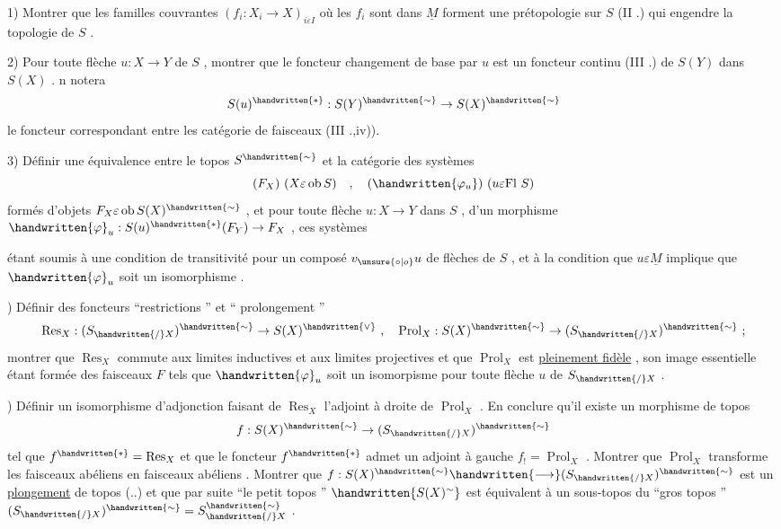1) Montrer que les familles couvrantes \((f_i:X_i\to X)_{i\varepsilon I}\) où les \(f_i\) sont dans \(\underline{M}\) forment une prétopologie sur \(S\) (II .) qui engendre la topologie de \(S\) .

2) Pour toute flèche \(u:X\to Y\) de \(S\) , montrer que le foncteur changement de base par \(u\) est un foncteur continu (III .) de \(S(Y)\) dans \(S(X)\) . n notera
\[
S(u)^{\handwritten{*}}:S(Y)^{\handwritten{\sim}}\to S(X)^{\handwritten{\sim}}
\]
le foncteur correspondant entre les catégorie de faisceaux (III .,iv)).

3) Définir une équivalence entre le topos \(S^{\handwritten{\sim}}\) et la catégorie des systèmes
\[
(F_X)\ (X\varepsilon\operatorname{ob}S)\quad,\quad(\handwritten{\varphi_u})\ (u\varepsilon\mathrm{Fl}\ S)
\]
formés d'objets \(F_X\varepsilon\operatorname{ob}S(X)^{\handwritten{\sim}}\) , et pour toute flèche \(u:X\to Y\) dans \(S\) , d'un morphisme \(\handwritten{\varphi}_u:S(u)^{\handwritten{*}}(F_Y)\to F_X\) , ces systèmes

étant soumis à une condition de transitivité pour un composé \(v_{\unsure{\circ|o}}u\) de flèches de \(S\) , et à la condition que \(u\varepsilon\underline{M}\) implique que \(\handwritten{\varphi}_u\) soit un isomorphisme .

) Définir des foncteurs ``restrictions '' et `` prolongement ''
\[
\operatorname{Res}_X:(S_{\handwritten{/}X})^{\handwritten{\sim}}\to S(X)^{\handwritten{\vee}}\ ,\quad
\operatorname{Prol}_X:S(X)^{\handwritten{\sim}}\to(S_{\handwritten{/}X})^{\handwritten{\sim}}\ ;
\]
montrer que \(\operatorname{Res}_X\) commute aux limites inductives et aux limites projectives et que \(\operatorname{Prol}_X\) est \uline{pleinement fidèle} , son image essentielle étant formée des faisceaux \(F\) tels que \(\handwritten{\varphi}_u\) soit un isomorpisme pour toute flèche \(u\) de  \(S_{\handwritten{/}X}\) .

) Définir un isomorphisme d'adjonction faisant de \(\operatorname{Res}_X\) l'adjoint à droite de \(\operatorname{Prol}_X\) . En conclure qu'il existe un morphisme de topos
\[
f:S(X)^{\handwritten{\sim}}\to(S_{\handwritten{/}X})^{\handwritten{\sim}}
\]
tel que \(f^{\handwritten{*}}=\operatorname{Res}_X\) et que le foncteur \(f^{\handwritten{*}}\) admet un adjoint à gauche \(f_!=\operatorname{Prol}_X\) . Montrer que \(\operatorname{Prol}_X\) transforme les faisceaux abéliens en faisceaux abéliens . Montrer que \(f:S(X)^{\handwritten{\sim}}\handwritten{\longrightarrow}(S_{\handwritten{/}X})^{\handwritten{\sim}}\) est un \uline{plongement} de topos (..) et que par suite ``le petit topos '' \(\handwritten{S(X)^{\sim}}\) est  équivalent à un sous-topos du ``gros topos '' \((S_{\handwritten{/}X})^{\handwritten{\sim}}=S^{\handwritten{\sim}}_{\handwritten{/}X}\) .

